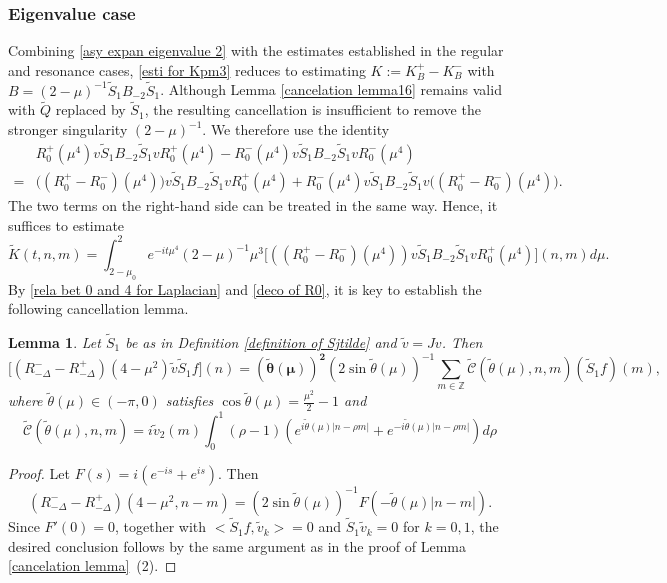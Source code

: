\documentclass[reqno, 11pt]{amsart}
\newtheorem{lemma}[definition]{Lemma}
\newcommand\Z{\mathbb{Z}}
\newcommand\mcaC{\mathcal{C}}
\numberwithin{equation}{section}
\begin{document}
\subsubsection{{\bf {Eigenvalue case}}} Combining \eqref{asy expan eigenvalue 2} with the estimates established in the regular and resonance cases, \eqref{esti for Kpm3} reduces to estimating $K:=K^+_B-K^-_B$ with $B=(2-\mu)^{-1}\widetilde{S}_1B_{-2}\widetilde{S}_1$. Although Lemma \ref{cancelation lemma16} remains valid with $\widetilde{Q}$ replaced by  $\widetilde{S}_1$, the resulting cancellation is insufficient to remove the stronger singularity $(2-\mu)^{-1}$. We therefore use the identity
\begin{align*}
&R^+_0(\mu^4)v\widetilde{S}_1B_{-2}\widetilde{S}_1vR^+_0(\mu^4)-R^-_0(\mu^4)v\widetilde{S}_1B_{-2}\widetilde{S}_1vR^-_0(\mu^4)\\
=&\big((R^+_0-R^-_0)(\mu^4)\big)v\widetilde{S}_1B_{-2}\widetilde{S}_1vR^+_0(\mu^4)+R^-_0(\mu^4)v\widetilde{S}_1B_{-2}\widetilde{S}_1v\big((R^+_0-R^-_0)(\mu^4)\big).
\end{align*}
The two terms on the right-hand side can be treated in the same way. Hence, it suffices to estimate 
\begin{equation*}
{\widetilde{K}}(t,n,m)=\int_{2-\mu_0}^{2}e^{-it\mu^4}(2-\mu)^{-1}\mu^3\big[((R^+_0-R^-_0)(\mu^4))v\widetilde{S}_1B_{-2}\widetilde{S}_1vR^+_0(\mu^4)\big](n,m)d\mu.
\end{equation*}
By \eqref{rela bet 0 and 4 for Laplacian} and \eqref{deco of R0}, it is key to establish the following cancellation lemma.
\begin{lemma}\label{cancelation lemma16 eigenvalue}
Let $\widetilde{S}_1$ be as in Definition \ref{definition of Sjtilde} and $\tilde{v}=Jv$. Then 
\begin{equation*}
\big[(R^{-}_{-\Delta}-R^{+}_{-\Delta})(4-\mu^2)\tilde{v}\widetilde{S}_1f\big](n)={\bm{(\tilde{\theta}(\mu))^2}}(2\sin\tilde{\theta}(\mu))^{-1}\sum\limits_{m\in\Z}\widetilde{\mcaC}(\tilde{\theta}(\mu),n,m)(\widetilde{S}_1f)(m),
\end{equation*}
where $\tilde{\theta}(\mu)\in(-\pi,0)$ satisfies $\cos\tilde{\theta}(\mu)=\frac{\mu^2}{2}-1$ and
\begin{equation*}
\widetilde{\mcaC}(\tilde{\theta}(\mu),n,m)=i\tilde{v}_2(m)\int_{0}^{1}(\rho-1)(e^{i\tilde{\theta}(\mu)|n-\rho m|}+e^{-i\tilde{\theta}(\mu)|n-\rho m|})d\rho
\end{equation*}
\end{lemma}
\begin{proof} Let $F(s)=i(e^{-is}+e^{is})$. Then
$$(R^{-}_{-\Delta}-R^{+}_{-\Delta})(4-\mu^2,n-m)=(2\sin\tilde{\theta}(\mu))^{-1}F(-\tilde{\theta}(\mu)|n-m|).$$
Since $F'(0)=0$, together with $\big<\widetilde{S}_1f,\tilde{v}_k\big>=0$ and $\widetilde{S}_1\tilde{v}_k=0$ for $k=0,1$, the desired conclusion follows by the same argument as in the proof of Lemma \ref{cancelation lemma}~(2).
\end{proof}
\end{document}
